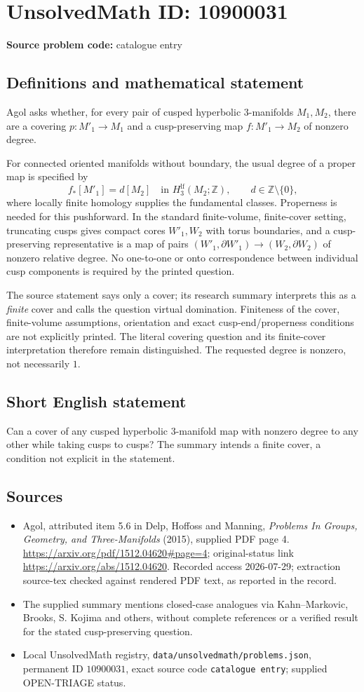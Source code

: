 \documentclass[11pt]{article}
\newcommand{\Z}{\mathbb{Z}}
\begin{document}
\section*{UnsolvedMath ID: 10900031}
\textbf{Source problem code:} catalogue entry
\subsection{Definitions and mathematical statement}
Agol asks whether, for every pair of cusped hyperbolic \(3\)-manifolds \(M_1,M_2\), there are a covering \(p:M'_1\to M_1\) and a cusp-preserving map \(f:M'_1\to M_2\) of nonzero degree.

For connected oriented manifolds without boundary, the usual degree of a proper map is specified by
\[
 f_*[M'_1]=d[M_2]\quad\text{in }H_3^{\mathrm{lf}}(M_2;\Z),
 \qquad d\in\Z\setminus\{0\},
\]
where locally finite homology supplies the fundamental classes. Properness is needed for this pushforward. In the standard finite-volume, finite-cover setting, truncating cusps gives compact cores \(W'_1,W_2\) with torus boundaries, and a cusp-preserving representative is a map of pairs
\((W'_1,\partial W'_1)\to(W_2,\partial W_2)\) of nonzero relative degree. No one-to-one or onto correspondence between individual cusp components is required by the printed question.

The source statement says only a cover; its research summary interprets this as a \emph{finite} cover and calls the question virtual domination. Finiteness of the cover, finite-volume assumptions, orientation and exact cusp-end/properness conditions are not explicitly printed. The literal covering question and its finite-cover interpretation therefore remain distinguished. The requested degree is nonzero, not necessarily \(1\).
\subsection{Short English statement}
Can a cover of any cusped hyperbolic \(3\)-manifold map with nonzero degree to any other while taking cusps to cusps? The summary intends a finite cover, a condition not explicit in the statement.
\subsection{Sources}
\begin{itemize}
\item Agol, attributed item 5.6 in Delp, Hoffoss and Manning, \emph{Problems In Groups, Geometry, and Three-Manifolds} (2015), supplied PDF page 4. \url{https://arxiv.org/pdf/1512.04620#page=4}; original-status link \url{https://arxiv.org/abs/1512.04620}. Recorded access 2026-07-29; extraction source-tex checked against rendered PDF text, as reported in the record.
\item The supplied summary mentions closed-case analogues via Kahn--Markovic, Brooks, S. Kojima and others, without complete references or a verified result for the stated cusp-preserving question.
\item Local UnsolvedMath registry, \texttt{data/unsolvedmath/problems.json}, permanent ID \(10900031\), exact source code \texttt{catalogue entry}; supplied OPEN-TRIAGE status.
\end{itemize}
\end{document}
